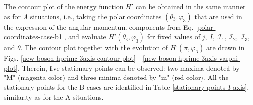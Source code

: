 The contour plot of the energy function $H'$ can be obtained in the same manner as for $A$ situations, i.e., taking the polar coordinates $(\theta_3,\varphi_3)$ that are used in the expression of the angular momentum components from Eq. \ref{polar-coordinates-case-b1}, and evaluate $H'(\theta_3,\varphi_3)$ for fixed values of $j,\ I,\ \mathcal{I}_1,\ \mathcal{I}_2,\ \mathcal{I}_3$, and $\theta$. The contour plot together with the evolution of $H'(\pi,\varphi_3)$ are drawn in Figs. \ref{new-boson-hprime-3axis-contour-plot} - \ref{new-boson-hprime-3axis-varphi-plot}. Therein, five stationary points can be observed: two maxima denoted by "M" (magenta color) and three minima denoted by "m" (red color). All the stationary points for the B cases are identified in Table \ref{stationary-points-3-axis}, similarity as for the A situations.
\begin{table}
    \centering
    \caption{The stationary points for the classical energy function depicted in Eq. \ref{new-boson-h-prime-classical}, when the quantization axis is the $3$-axis. Each point corresponds to the cases $B1$, $B2$, and $B3$, respectively.}
    \label{stationary-points-3-axis}
\end{table}

